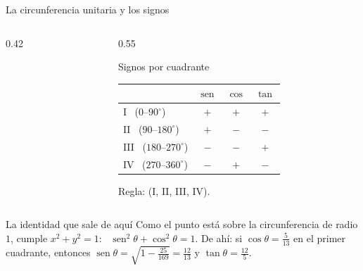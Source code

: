 \documentclass[aspectratio=169,10pt]{beamer}
\begin{document}
\begin{frame}{La circunferencia unitaria y los signos}
  \scriptsize
  \begin{columns}[T,onlytextwidth]
    \begin{column}{0.42\textwidth}
      \vspace{0.05cm}
      \begin{center}
      \end{center}
    \end{column}
    \begin{column}{0.55\textwidth}
      \begin{block}{Signos por cuadrante}
        \tiny
        \begin{center}
        \begin{tabular}{@{}lccc@{}}
          \toprule
          & $\operatorname{sen}$ & $\cos$ & $\tan$ \\
          \midrule
          I \ ($0$–$90^{\circ}$)    & $+$ & $+$ & $+$ \\
          II \ ($90$–$180^{\circ}$)  & $+$ & $-$ & $-$ \\
          III \ ($180$–$270^{\circ}$) & $-$ & $-$ & $+$ \\
          IV \ ($270$–$360^{\circ}$)  & $-$ & $+$ & $-$ \\
          \bottomrule
        \end{tabular}
        \end{center}
        \vspace{0.05cm}
        Regla:  (I, II, III, IV).
      \end{block}
    \end{column}
  \end{columns}

  \vspace{0.04cm}
  \begin{exampleblock}{La identidad que sale de aquí}
    \tiny
    Como el punto está sobre la circunferencia de radio $1$, cumple
    $x^{2}+y^{2}=1$: \ $\operatorname{sen}^{2}\theta + \cos^{2}\theta = 1$.
     De ahí: si
    $\cos\theta=\frac{5}{13}$ en el primer cuadrante, entonces
    $\operatorname{sen}\theta=\sqrt{1-\frac{25}{169}}=\frac{12}{13}$ y
    $\tan\theta=\frac{12}{5}$.
  \end{exampleblock}
\end{frame}
\end{document}
